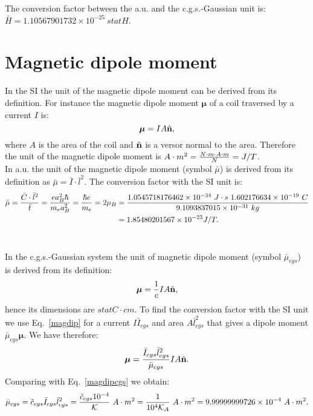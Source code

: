\documentclass[12pt,a4paper]{article}
\def\hbarf{1.0545718176462\times 10^{-34}}
\def\e{1.602176634\times 10^{-19}}
\def\me{9.1093837015\times 10^{-31}}
\def\barmu{1.85480201567\times 10^{-23}}
\def\mutomu{9.99999999726\times 10^{-4}}
\def\barycgs{1.10567901732\times 10^{-25}}
\begin{document}
{\color{green} 
The conversion factor between the a.u. and the c.g.s.-Gaussian unit is: 
$\bar H = \barycgs\ statH$.
}

\newpage
\section{\color{coral}Magnetic dipole moment}
In the SI the unit of the magnetic dipole moment
can be derived from its definition. For instance the magnetic dipole 
moment ${\boldsymbol \mu}$ of a coil traversed by a current $I$ is:
\begin{equation}
{\boldsymbol \mu}=IA \hat {\bf n},
\label{magdip}
\end{equation}
where $A$ is the area of the coil and $\hat {\bf n}$ is a versor 
normal to the area. Therefore the unit of the magnetic dipole moment is 
$A\cdot m^2={N \cdot m \cdot  A \cdot m \over N}=J/T$.  
\\

{\color{web-blue} In a.u. the unit of the magnetic dipole moment 
(symbol $\bar \mu$) is derived from its definition as 
$\bar \mu= \bar I \cdot \bar l^2$. The conversion factor with the SI unit
is: 
\begin{align}
\bar \mu = {\bar C \cdot \bar l^2 \over \bar t}= 
{e a_B^2 \hbar \over m_e a_B^2}
= {\hbar e \over m_e}=2 \mu_B &=
{\hbarf\ J\cdot s\ \e\ C \over \me\ kg}\nonumber \\ 
&= \barmu J/T.
\end{align}
\\
}

{\color{orange} In the c.g.s.-Gaussian system the unit of magnetic dipole
moment (symbol $\bar \mu_{cgs}$) is derived from its definition:
\begin{equation}
{\boldsymbol \mu}={1\over c} I A \hat {\bf n},
\label{magdipcgs}
\end{equation}
hence its dimensions are 
$statC\cdot cm$. To find the conversion factor with the SI unit we use
Eq.~\ref{magdip} for a current $I \bar I_{cgs}$ and area $A \bar l_{cgs}^2$
that gives a dipole moment $\bar \mu_{cgs} {\boldsymbol \mu}$. We have
therefore:
\begin{equation}
{\boldsymbol \mu} = {\bar I_{cgs} \bar l_{cgs}^2 \over \bar \mu_{cgs} }
I A \hat {\bf n}.
\end{equation} 
Comparing with Eq.~\ref{magdipcgs} we obtain:
\begin{equation}
\bar \mu_{cgs}= \tilde c_{cgs} \bar I_{cgs} \bar l_{cgs}^2= 
{\tilde c_{cgs} 10^{-4} \over \mathcal{K}}\ A\cdot m^2 = 
{1\over 10^4 \mathcal{K}_A}\ A\cdot m^2 = \mutomu\ A\cdot m^2.
\end{equation}
}
\\
\end{document}
